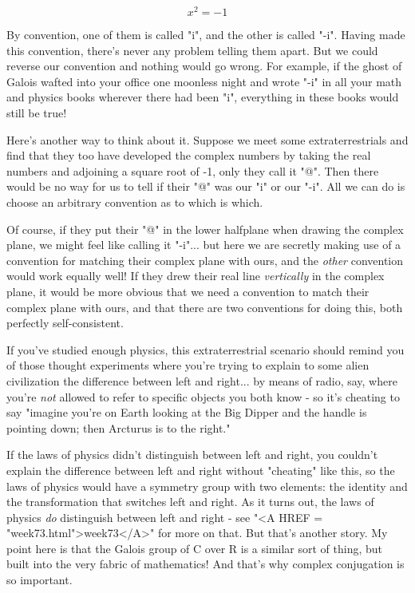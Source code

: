 $$
x^{2} = -1
$$
    
By convention, one of them is called "i", and the other is called
"-i".  Having made this convention, there's never any problem telling
them apart.  But we could reverse our convention and nothing would
go wrong.   For example, if the ghost of Galois wafted into your office
one moonless night and wrote "-i" in all your math and physics books 
wherever there had been "i", everything in these books would still be true!

Here's another way to think about it.  Suppose we meet some 
extraterrestrials and find that they too have developed the complex 
numbers by taking the real numbers and adjoining a square root of -1, 
only they call it "@".  Then there would be no way for us to tell if 
their "@" was our "i" or our "-i".  All we can do is choose an arbitrary
convention as to which is which.

Of course, if they put their "@" in the lower halfplane when 
drawing the 
complex plane, we might feel like calling it "-i"... but here we are 
secretly making use of a convention for matching their complex plane with 
ours, and the \emph{other} convention would work equally well!  If they drew 
their real line \emph{vertically} in the complex plane, it would be more 
obvious that we need a convention to match their complex plane with ours, 
and that there are two conventions for doing this, both perfectly 
self-consistent.  

If you've studied enough physics, this extraterrestrial scenario 
should remind you of those thought experiments where you're trying to
explain to some alien civilization the difference between left and
right... by means of radio, say, where you're \emph{not} allowed to refer
to specific objects you both know - so it's cheating to say "imagine 
you're on Earth looking at the Big Dipper and the handle is pointing 
down; then Arcturus is to the right."  

If the laws of physics didn't distinguish between left and right, 
you couldn't explain the difference between left and right without 
"cheating" like this, so the laws of physics would have a symmetry 
group with two elements: the identity and the transformation that 
switches left and right.  As it turns out, the laws of physics \emph{do}
distinguish between left and right - see "<A HREF = "week73.html">week73</A>" for more on that.  
But that's another story.  My point here is that the Galois group of C 
over R is a similar sort of thing, but built into the very fabric of 
mathematics!  And that's why complex conjugation is so important.  


